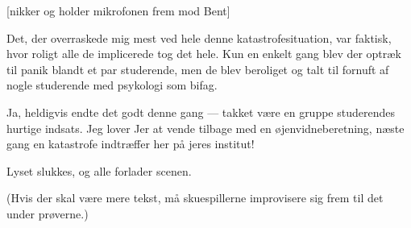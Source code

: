 \documentclass[a4paper,11pt]{article}
\begin{document}
\begin{sketch}
[nikker og holder mikrofonen frem mod Bent]

     Det, der overraskede mig mest ved hele denne
     katastrofesituation, var faktisk, hvor roligt alle de
     implicerede tog det hele. Kun en enkelt gang blev der
     optræk til panik blandt et par studerende, men de blev
     beroliget og talt til fornuft af nogle studerende med
     psykologi som bifag.

     Ja, heldigvis endte det godt denne gang --- takket være
     en gruppe studerendes hurtige indsats. Jeg lover Jer at
     vende tilbage med en øjenvidneberetning, næste gang en
     katastrofe indtræffer her på jeres institut!

\scene

Lyset slukkes, og alle forlader scenen.

\end{sketch}

(Hvis der skal være mere tekst, må skuespillerne improvisere
sig frem til det under prøverne.)
\end{document}
